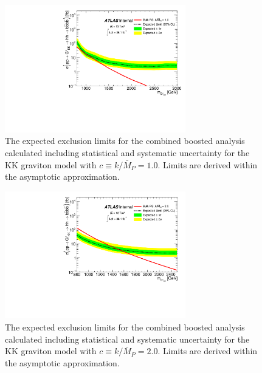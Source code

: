 \begin{figure}
\begin{center}
\includegraphics[angle=270, width=0.7\textwidth]{figures/boosted/Limit_Stat/BrazilPlot_Asymptotic_RSGC10_merged.pdf}
\caption{The expected exclusion limits for the combined boosted analysis calculated including statistical and systematic uncertainty for the KK graviton model with $c \equiv k/\bar{M}_P = 1.0$. Limits are derived within the asymptotic approximation.}
\label{fig:brazil_hh_boosted_all_c10_syst}
\end{center}
\end{figure}

\begin{figure}
\begin{center}
\includegraphics[angle=270, width=0.7\textwidth]{figures/boosted/Limit_Stat/BrazilPlot_Asymptotic_RSGC20_merged.pdf}
\caption{The expected exclusion limits for the combined boosted analysis calculated including statistical and systematic uncertainty for the KK graviton model with $c \equiv k/\bar{M}_P = 2.0$. Limits are derived within the asymptotic approximation.}
\label{fig:brazil_hh_boosted_all_c20_syst}
\end{center}
\end{figure}

